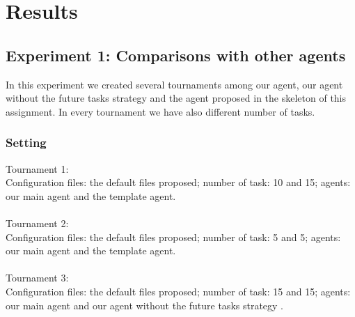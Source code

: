 \documentclass[11pt]{article}
\begin{document}

\section{Results}

\subsection{Experiment 1: Comparisons with other agents}
In this experiment we created several tournaments among our agent, our agent without the future tasks strategy and the agent proposed in the skeleton of this assignment. In every tournament we have also different number of tasks.

\subsubsection{Setting}
Tournament 1: 
\\
Configuration files: the default files proposed; number of task: 10 and 15; agents: our main agent and the template agent.
\\
\\
Tournament 2: 
\\
Configuration files: the default files proposed; number of task: 5 and 5; agents: our main agent and the template agent.
\\
\\
Tournament 3: 
\\
Configuration files: the default files proposed; number of task: 15 and 15; agents: our main agent and our agent without the future tasks strategy .
\\
\\
\\
\\
\end{document}

